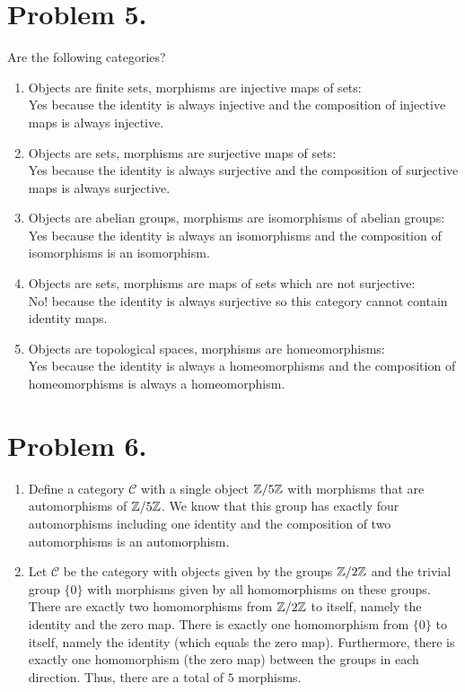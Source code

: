 \documentclass[12pt]{extarticle}
\begin{document}
\section*{Problem 5.}
Are the following categories?
\begin{enumerate}
\item Objects are finite sets, morphisms are injective maps of sets: \bigskip\\
Yes because the identity is always injective and the composition of injective maps is always injective.

\item Objects are sets, morphisms are surjective maps of sets: \bigskip\\
Yes because the identity is always surjective and the composition of surjective maps is always surjective.

\item  Objects are abelian groups, morphisms are isomorphisms of abelian groups: \bigskip\\
Yes because the identity is always an isomorphisms and the composition of isomorphisms is an isomorphism.

\item Objects are sets, morphisms are maps of sets which are not surjective: \bigskip\\
No! because the identity is always surjective so this category cannot contain identity maps.

\item Objects are topological spaces, morphisms are homeomorphisms: \bigskip\\
Yes because the identity is always a homeomorphisms and the composition of homeomorphisms is always a homeomorphism.

\end{enumerate}

\section*{Problem 6.}

\begin{enumerate}
\item Define a category $\mathcal{C}$ with a single object $\mathbb{Z}/5\mathbb{Z}$ with morphisms that are automorphisms of $\mathbb{Z}/5\mathbb{Z}$. We know that this group has exactly four automorphisms including one identity and the composition of two automorphisms is an automorphism. 
\item Let $\mathcal{C}$ be the category with objects given by the groups $\mathbb{Z}/2\mathbb{Z}$ and the trivial group $\{0\}$ with morphisms given by all homomorphisms on these groups. There are exactly two homomorphisms from $\mathbb{Z}/2\mathbb{Z}$ to itself, namely the identity and the zero map. There is exactly one homomorphism from $\{0\}$ to itself, namely the identity (which equals the zero map). Furthermore, there is exactly one homomorphism (the zero map) between the groups in each direction. Thus, there are a total of $5$ morphisms. 
\end{enumerate}
\end{document}
